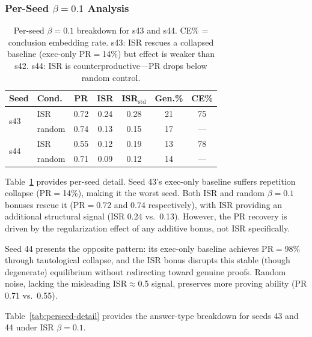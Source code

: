 \documentclass[11pt,a4paper]{article}
\begin{document}
\subsubsection{Per-Seed $\beta{=}0.1$ Analysis}

\begin{table}[t]
\centering
\small
\begin{tabular}{llccccc}
\toprule
\textbf{Seed} & \textbf{Cond.} & \textbf{PR} & \textbf{ISR} & \textbf{ISR$_{\text{std}}$} & \textbf{Gen.\%} & \textbf{CE\%} \\
\midrule
\multirow{2}{*}{s43} & ISR & 0.72 & 0.24 & 0.28 & 21 & 75 \\
 & random & 0.74 & 0.13 & 0.15 & 17 & --- \\
\midrule
\multirow{2}{*}{s44} & ISR & 0.55 & 0.12 & 0.19 & 13 & 78 \\
 & random & 0.71 & 0.09 & 0.12 & 14 & --- \\
\bottomrule
\end{tabular}
\caption{Per-seed $\beta{=}0.1$ breakdown for s43 and s44. CE\% = conclusion embedding rate. s43: ISR rescues a collapsed baseline (exec-only PR$=$14\%) but effect is weaker than s42. s44: ISR is counterproductive---PR drops below random control.}
\label{tab:perseed}
\end{table}

Table~\ref{tab:perseed} provides per-seed detail.
Seed 43's exec-only baseline suffers repetition collapse (PR$=$14\%), making it the worst seed.
Both ISR and random $\beta{=}0.1$ bonuses rescue it (PR$=$0.72 and 0.74 respectively), with ISR providing an additional structural signal (ISR 0.24 vs.\ 0.13).
However, the PR recovery is driven by the regularization effect of any additive bonus, not ISR specifically.

Seed 44 presents the opposite pattern: its exec-only baseline achieves PR$=$98\% through tautological collapse, and the ISR bonus disrupts this stable (though degenerate) equilibrium without redirecting toward genuine proofs.
Random noise, lacking the misleading ISR$\approx$0.5 signal, preserves more proving ability (PR 0.71 vs.\ 0.55).

Table~\ref{tab:perseed-detail} provides the answer-type breakdown for seeds 43 and 44 under ISR $\beta{=}0.1$.
\end{document}
